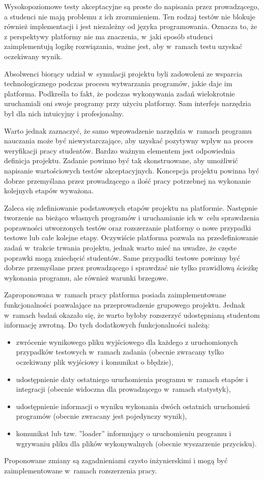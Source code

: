 Wysokopoziomowe testy akceptacyjne są proste do napisania przez prowadzącego, a studenci nie mają problemu z ich zrozumieniem.
Ten rodzaj testów nie blokuje również implementacji i jest niezależny od języka programowania.
Oznacza to, że z perspektywy platformy nie ma znaczenia, w~jaki sposób studenci zaimplementują logikę rozwiązania, ważne jest, aby w~ramach testu uzyskać oczekiwany wynik.

Absolwenci biorący udział w~symulacji projektu byli zadowoleni ze wsparcia technologicznego podczas procesu wytwarzania programów, jakie daje im platforma.
Podkreśla to fakt, że podczas wykonywania zadań wielokrotnie uruchamiali oni swoje programy przy użyciu platformy.
Sam interfejs narzędzia był dla nich intuicyjny i profesjonalny.

Warto jednak zaznaczyć, że samo wprowadzenie narzędzia w~ramach programu nauczania może być niewystarczające, aby uzyskać pozytywny wpływ na proces weryfikacji pracy studentów.
Bardzo ważnym elementem jest odpowiednia definicja projektu.
Zadanie powinno być tak skonstruowane, aby umożliwić napisanie wartościowych testów akceptacyjnych.
Koncepcja projektu powinna być dobrze przemyślana przez prowadzącego a ilość pracy potrzebnej na wykonanie kolejnych etapów wyważona.

Zaleca się zdefiniowanie podstawowych etapów projektu na platformie.
Następnie tworzenie na bieżąco własnych programów i uruchamianie ich w~celu sprawdzenia poprawności utworzonych testów oraz rozszerzanie platformy o nowe przypadki testowe lub całe kolejne etapy.
Oczywiście platforma pozwala na przedefiniowanie zadań w~trakcie trwania projektu, jednak warto mieć na uwadze, że częste poprawki mogą zniechęcić studentów.
Same przypadki testowe powinny być dobrze przemyślane przez prowadzącego i sprawdzać nie tylko prawidłową ścieżkę wykonania programu, ale również warunki brzegowe.

Zaproponowana w~ramach pracy platforma posiada zaimplementowane funkcjonalności pozwalające na przeprowadzenie grupowego projektu.
Jednak w~ramach badań okazało się, że warto byłoby rozszerzyć udostępnianą studentom informację zwrotną.
Do tych dodatkowych funkcjonalności należą:
\begin{itemize}
    \item zwrócenie wynikowego pliku wyjściowego dla każdego z uruchomionych przypadków testowych w~ramach zadania (obecnie zwracany tylko oczekiwany plik wyjściowy i komunikat o błędzie),
    \item udostępnienie daty ostatniego uruchomienia programu w~ramach etapów i integracji (obecnie widoczna dla prowadzącego w~ramach statystyk),
    \item udostępnienie informacji o wyniku wykonania dwóch ostatnich uruchomień programów (obecnie zwracany jest pojedynczy wynik),
    \item komunikat lub tzw. ”loader” informujący o uruchomieniu programu i wgrywaniu pliku dla plików wykonywalnych (obecnie wyszarzenie przycisku).
\end{itemize}
Proponowane zmiany są zagadnieniami czysto inżynierskimi i mogą być zaimplementowane w~ramach rozszerzenia pracy.

